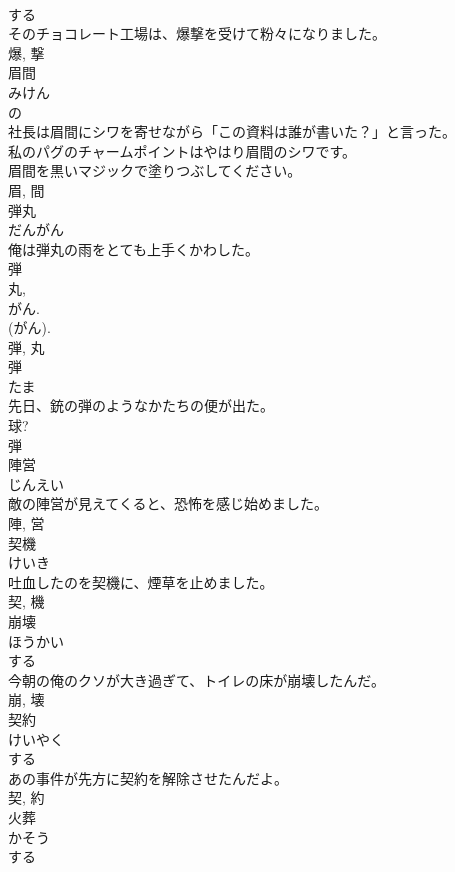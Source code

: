 \documentclass[8pt]{extreport}
\begin{document}
\begin{CJK}{UTF8}{min}
\\	する 
\\	そのチョコレート工場は、爆撃を受けて粉々になりました。	
\\	爆, 撃	
\\	眉間	
\\	みけん	
\\	の 
\\	社長は眉間にシワを寄せながら「この資料は誰が書いた？」と言った。	
\\	私のパグのチャームポイントはやはり眉間のシワです。	
\\	眉間を黒いマジックで塗りつぶしてください。	
\\	眉, 間	
\\	弾丸	
\\	だんがん	
\\	俺は弾丸の雨をとても上手くかわした。	
\\	弾 
\\	丸, 
\\	がん. 
\\	(がん). 
\\	弾, 丸	
\\	弾	
\\	たま	
\\	先日、銃の弾のようなかたちの便が出た。	
\\	球? 
\\	弾	
\\	陣営	
\\	じんえい	
\\	敵の陣営が見えてくると、恐怖を感じ始めました。	
\\	陣, 営	
\\	契機	
\\	けいき	
\\	吐血したのを契機に、煙草を止めました。	
\\	契, 機	
\\	崩壊	
\\	ほうかい	
\\	する 
\\	今朝の俺のクソが大き過ぎて、トイレの床が崩壊したんだ。	
\\	崩, 壊	
\\	契約	
\\	けいやく	
\\	する 
\\	あの事件が先方に契約を解除させたんだよ。	
\\	契, 約	
\\	火葬	
\\	かそう	
\\	する 

\end{CJK}
\end{document}
